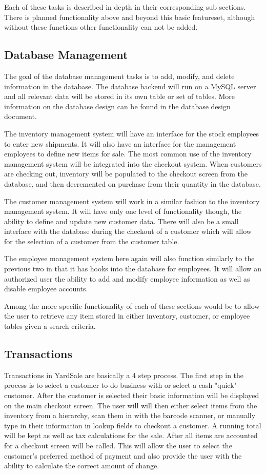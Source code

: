 \documentclass[a4paper,10pt]{article}
\begin{document}
Each of these tasks is described in depth in their corresponding sub sections. There is planned functionality above and beyond this basic featureset, although without these functions other functionality can not be added.

\subsection{Database Management}

The goal of the database management tasks is to add, modify, and delete information in the database. The database backend will run on a MySQL server and all relevant data will be stored in its own table or set of tables. More information on the database design can be found in the database design document.

The inventory management system will have an interface for the stock employees to enter new shipments. It will also have an interface for the management employees to define new items for sale. The most common use of the inventory management system will be integrated into the checkout system. When customers are checking out, inventory will be populated to the checkout screen from the database, and then decremented on purchase from their quantity in the database.

The customer management system will work in a similar fashion to the inventory management system. It will have only one level of functionality though, the ability to define and update new customer data. There will also be a small interface with the database during the checkout of a customer which will allow for the selection of a customer from the customer table.

The employee management system here again will also function similarly to the previous two in that it has hooks into the database for employees. It will allow an authorized user the ability to add and modify employee information as well as disable employee accounts.

Among the more specific functionality of each of these sections would be to allow the user to retrieve any item stored in either inventory, customer, or employee tables given a search criteria. 

\subsection{Transactions}

Transactions in YardSale are basically a 4 step process. The first step in the process is to select a customer to do business with or select a cash "quick" customer. After the customer is selected their basic information will be displayed on the main checkout screen. The user will will then either select items from the inventory from a hierarchy, scan them in with the barcode scanner, or manually type in their information in lookup fields to checkout a customer. A running total will be kept as well as tax calculations for the sale. After all items are accounted for a checkout screen will be called. This will allow the user to select the customer's preferred method of payment and also provide the user with the ability to calculate the correct amount of change.
\end{document}

